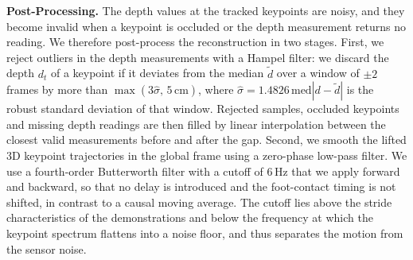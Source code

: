 \textbf{Post-Processing.} The depth values at the tracked keypoints are noisy, and they become invalid when a keypoint is occluded or the depth measurement returns no reading. We therefore post-process the reconstruction in two stages. First, we reject outliers in the depth measurements with a Hampel filter: we discard the depth $d_t$ of a keypoint if it deviates from the median $\tilde{d}$ over a window of $\pm 2$ frames by more than $\max(3\hat{\sigma},\, 5\,\mathrm{cm})$, where $\hat{\sigma} = 1.4826\,\mathrm{med}|d - \tilde{d}|$ is the robust standard deviation of that window. Rejected samples, occluded keypoints and missing depth readings are then filled by linear interpolation between the closest valid measurements before and after the gap. Second, we smooth the lifted 3D keypoint trajectories in the global frame using a zero-phase low-pass filter. We use a fourth-order Butterworth filter with a cutoff of $6\,$Hz that we apply forward and backward, so that no delay is introduced and the foot-contact timing is not shifted, in contrast to a causal moving average. The cutoff lies above the stride characteristics of the demonstrations and below the frequency at which the keypoint spectrum flattens into a noise floor, and thus separates the motion from the sensor noise.

